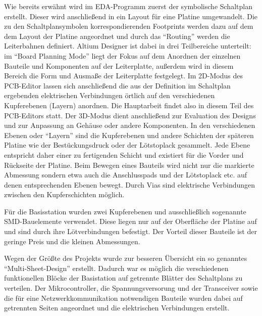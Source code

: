Wie bereits erwähnt wird im \ac{EDA}-Programm zuerst der symbolische Schaltplan erstellt. Dieser wird anschließend in ein Layout für eine Platine umgewandelt. Die zu den Schaltplansymbolen korrespondierenden Footprints werden dazu auf dem dem Layout der Platine angeordnet und durch das \enquote{Routing} werden die Leiterbahnen definiert.
Altium Designer ist dabei in drei Teilbereiche unterteilt: im \enquote{Board Planning Mode}  liegt der Fokus auf dem Anordnen der einzelnen Bauteile und Komponenten auf der Leiterplatte, außerdem wird in diesem Bereich die Form und Ausmaße der Leiterplatte festgelegt. Im 2D-Modus des \ac{PCB}-Editor lassen sich anschließend die aus der Definition im Schaltplan ergebenden elektrischen Verbindungen örtlich auf den verschiedenen Kupferebenen (Layern) anordnen. Die Hauptarbeit findet also in diesem Teil des \ac{PCB}-Editors statt. Der 3D-Modus dient anschließend zur Evaluation des Designs und zur Anpassung an Gehäuse oder andere Komponenten.
In den verschiedenen Ebenen oder \enquote{Layern} sind die Kupferebenen und andere Schichten der späteren Platine wie der Bestückungsdruck oder der Lötstoplack gesammelt. Jede Ebene entspricht daher einer zu fertigenden Schicht und existiert für die Vorder und Rückseite der Platine. Beim Bewegen eines Bauteils wird nicht nur die markierte Abmessung sondern etwa auch die Anschlusspads und der Lötstoplack etc. auf denen entsprechenden Ebenen bewegt. Durch Vias sind elektrische Verbindungen zwischen den Kupferschichten möglich.

Für die Basisstation wurden zwei Kupferebenen und ausschließlich sogenannte \ac{SMD}-Bauelemente verwendet. Diese liegen nur auf der Oberfläche der Platine auf und sind durch ihre Lötverbindungen befestigt. Der Vorteil dieser Bauteile ist der geringe Preis und die kleinen Abmessungen. 


Wegen der Größte des Projekts wurde zur besseren Übersicht ein  so genanntes \enquote{Multi-Sheet-Design} erstellt. Dadurch war es möglich die verschiedenen funktionellen Blöcke der Basistation auf getrennte Blätter des Schaltplans zu verteilen. Der Mikrocontroller, die Spannungsversorung und der Transceiver sowie die für eine Netzwerkkommunikation notwendigen Bauteile  wurden dabei auf getrennten Seiten angeordnet und die elektrischen Verbindungen erstellt.

